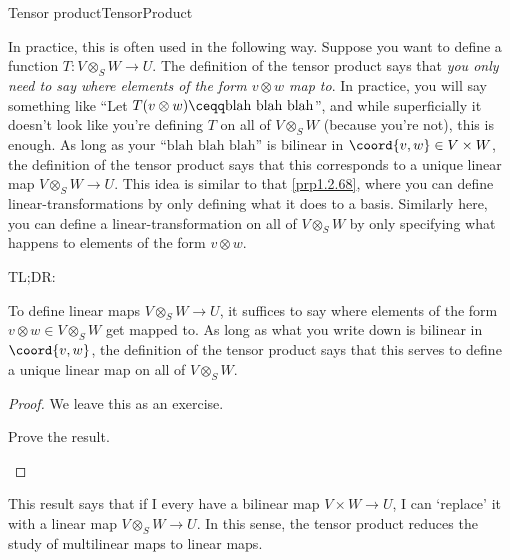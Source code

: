 \begin{thm}{Tensor product}{TensorProduct}
\begin{rmk}
		In practice, this is often used in the following way.  Suppose you want to define a function $T\colon V\otimes _SW\rightarrow U$.  The definition of the tensor product says that \emph{you only need to say where elements of the form $v\otimes w$ map to}.  In practice, you will say something like ``Let $T(v\otimes w)\ceqq \text{blah blah blah}$\textellipsis'', and while superficially it doesn't look like you're defining $T$ on all of $V\otimes _SW$ (because you're not), this is enough.  As long as your ``$\text{blah blah blah}$'' is bilinear in $\coord{v,w}\in V\times W$, the definition of the tensor product says that this corresponds to a unique linear map $V\otimes _SW\rightarrow U$.  This idea is similar to that \cref{prp1.2.68}, where you can define linear-transformations by only defining what it does to a basis.  Similarly here, you can define a linear-transformation on all of $V\otimes _SW$ by only specifying what happens to elements of the form $v\otimes w$.
		
		TL;DR:
		\begin{displayquote}
			To define linear maps $V\otimes _SW\rightarrow U$, it suffices to say where elements of the form $v\otimes w\in V\otimes _SW$ get mapped to.  As long as what you write down is bilinear in $\coord{v,w}$, the definition of the tensor product says that this serves to define a unique linear map on all of $V\otimes _SW$.
		\end{displayquote}
	\end{rmk}
	\begin{proof}
		We leave this as an exercise.
		\begin{exr}[breakable=false]{}{}
			Prove the result.
		\end{exr}
	\end{proof}
\end{thm}
This result says that if I every have a bilinear map $V\times W\rightarrow U$, I can `replace' it with a linear map $V\otimes _SW\rightarrow U$.  In this sense, the tensor product reduces the study of multilinear maps to linear maps.

